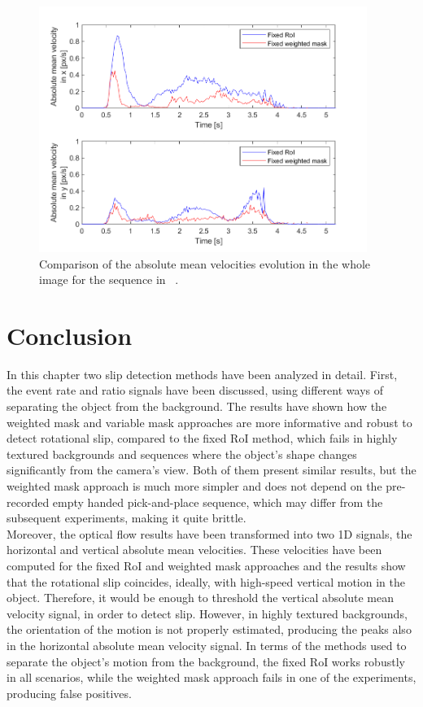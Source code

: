 \begin{figure}[H]
    \centering
    \includegraphics[width=0.95\textwidth]{resources/images/OF_comparison_hb1_tt}
    \caption{Comparison of the absolute mean velocities evolution in the whole image for the sequence in ~.}\label{fig:OF_comparison_hb1_tt}
\end{figure}

\section{Conclusion}

In this chapter two slip detection methods have been analyzed in detail. First, the event rate and ratio signals have been discussed, using different ways of separating the object from the background. The results have shown how the weighted mask and variable mask approaches are more informative and robust to detect rotational slip, compared to the fixed RoI method, which fails in highly textured backgrounds and  sequences where the object's shape changes significantly from the camera's view. Both of them present similar results, but the weighted mask approach is much more simpler and does not depend on the pre-recorded empty handed pick-and-place sequence, which may differ from the subsequent experiments, making it quite brittle.\\

Moreover, the optical flow results have been transformed into two 1D signals, the horizontal and vertical absolute mean velocities. These velocities have been computed for the fixed RoI and weighted mask approaches and the results show that the rotational slip coincides, ideally, with high-speed vertical motion in the object. Therefore, it would be enough to threshold the vertical absolute mean velocity signal, in order to detect slip. However, in highly textured backgrounds, the orientation of the motion is not properly estimated, producing the peaks also in the horizontal absolute mean velocity signal. In terms of the methods used to separate the object's motion from the background, the fixed RoI works robustly in all scenarios, while the weighted mask approach fails in one of the experiments, producing false positives.\\

